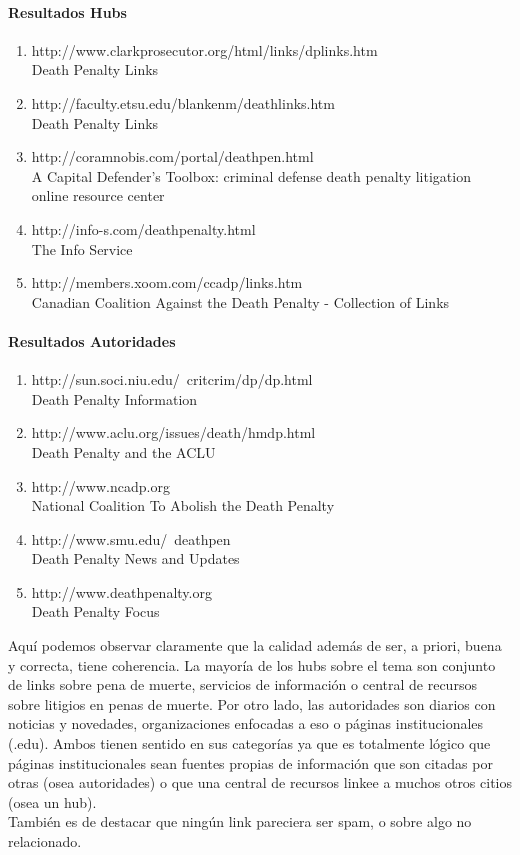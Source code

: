 

\paragraph{Resultados Hubs}
\begin{enumerate}
\item
http://www.clarkprosecutor.org/html/links/dplinks.htm\\
Death Penalty Links
\item
http://faculty.etsu.edu/blankenm/deathlinks.htm\\
Death Penalty Links
\item
http://coramnobis.com/portal/deathpen.html\\
A Capital Defender's Toolbox: criminal defense  death penalty litigation online resource center
\item
http://info-s.com/deathpenalty.html\\
The Info Service
\item
http://members.xoom.com/ccadp/links.htm\\
Canadian Coalition Against the Death Penalty - Collection of Links
\end{enumerate}

\paragraph{Resultados Autoridades}
\begin{enumerate}
\item
http://sun.soci.niu.edu/~critcrim/dp/dp.html\\
Death Penalty Information
\item
http://www.aclu.org/issues/death/hmdp.html\\
Death Penalty and the ACLU
\item
http://www.ncadp.org\\
National Coalition To Abolish the Death Penalty
\item
http://www.smu.edu/~deathpen\\
Death Penalty News and Updates
\item
http://www.deathpenalty.org\\
Death Penalty Focus
\end{enumerate}

Aquí podemos observar claramente que la calidad además de ser, a priori, buena y correcta, tiene coherencia. La mayoría de los hubs sobre el tema son conjunto de links sobre pena de muerte, servicios de información o 
central de recursos sobre litigios en penas de muerte. Por otro lado, las autoridades son diarios con noticias y novedades, organizaciones enfocadas a eso o páginas institucionales (.edu). Ambos tienen sentido en sus 
categorías ya que es totalmente lógico que páginas institucionales sean fuentes propias de información que son citadas por otras (osea autoridades) o que una central de recursos linkee a muchos otros citios (osea un hub).\\
También es de destacar que ningún link pareciera ser spam, o sobre algo no relacionado.

